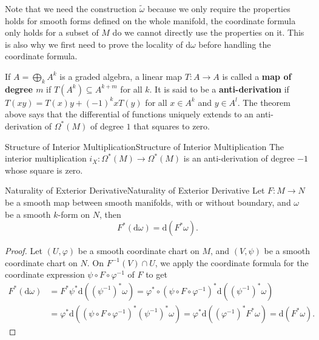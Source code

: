 \documentclass[../main.tex]{subfiles}
\begin{document}
\begin{remark}
  Note that we need the construction $\tilde{\omega}$ because we only require the properties holds for smooth forms defined on the whole manifold, the coordinate formula only holds for a subset of $M$ do we cannot directly use the properties on it. This is also why we first need to prove the locality of $\mathrm{d} \omega$ before handling the coordinate formula.
\end{remark}

If $A = \bigoplus_k A^k$ is a graded algebra, a linear map $T :A \rightarrow A$ is called a \textbf{map of degree $m$} if $T(A^k) \subseteq A^{k+m}$ for all $k$. It is said to be a \textbf{anti-derivation} if $T(x y) = T(x) y + (-1)^{k} x T(y)$ for all $x \in A^k$ and $y \in A^l$. The theorem above says that the differential of functions uniquely extends to an anti-derivation of $\Omega^*(M)$ of degree $1$ that squares to zero.

\begin{proposition}{Structure of Interior Multiplication}{Structure of Interior Multiplication}
  The interior multiplication $i_X : \Omega^*(M) \to \Omega^*(M)$ is an anti-derivation of degree $-1$ whose square is zero.
\end{proposition}

\begin{proposition}{Naturality of Exterior Derivative}{Naturality of Exterior Derivative}
  Let $F: M \to N$ be a smooth map between smooth manifolds, with or without boundary, and $\omega$ be a smooth $k$-form on $N$, then
  \begin{equation*}
    F^*(\mathrm{d} \omega) = \mathrm{d} (F^* \omega).
  \end{equation*}
\end{proposition}
\begin{proof}
  Let $(U, \varphi)$ be a smooth coordinate chart on $M$, and $(V, \psi)$ be a smooth coordinate chart on $N$. On $F^{-1}(V) \cap U$, we apply the coordinate formula for the coordinate expression $ \psi \circ F \circ \varphi^{-1}$ of $F$ to get
  \begin{equation*}
    \begin{aligned}
      F^*(\mathrm{d} \omega) &= F^* \psi^* \mathrm{d} ((\psi^{-1})^* \omega) = \varphi^* \circ (\psi \circ F \circ \varphi^{-1})^* \mathrm{d} ((\psi^{-1})^* \omega)\\
      &= \varphi^* \mathrm{d} ((\psi \circ F \circ \varphi^{-1})^* (\psi^{-1})^* \omega) = \varphi^* \mathrm{d} ((\varphi^{-1})^* F^* \omega) = \mathrm{d} (F^* \omega).
    \end{aligned}
  \end{equation*}
\end{proof}
\end{document}
